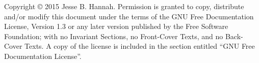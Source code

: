 \vspace*{\fill}
\begin{center}
Copyright \copyright{} 2015 Jesse B. Hannah.
Permission is granted to copy, distribute and/or modify this document
under the terms of the GNU Free Documentation License, Version 1.3
or any later version published by the Free Software Foundation;
with no Invariant Sections, no Front-Cover Texts, and no Back-Cover Texts.
A copy of the license is included in the section entitled ``GNU
Free Documentation License''.
\end{center}
\vspace*{\fill}
